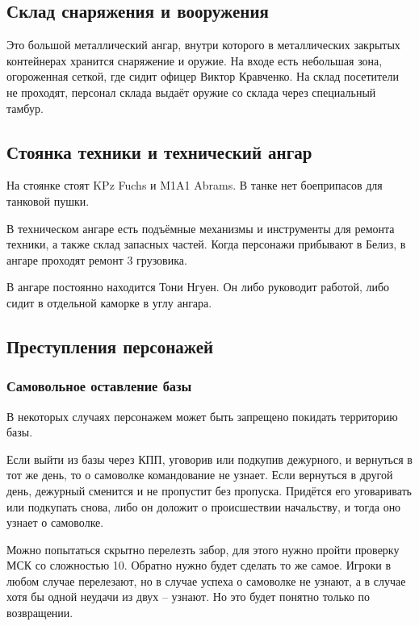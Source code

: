 \documentclass{article}
\begin{document}
\subsection{Склад снаряжения и
вооружения}\label{equipment-storage}

Это большой металлический ангар, внутри которого в металлических
закрытых контейнерах хранится снаряжение и оружие. На входе есть
небольшая зона, огороженная сеткой, где сидит офицер Виктор Кравченко.
На склад посетители не проходят, персонал склада выдаёт оружие со склада
через специальный тамбур.

\subsection{Стоянка техники и технический
ангар}\label{vehicle-parking}

На стоянке стоят KPz Fuchs и M1A1 Abrams. В танке нет боеприпасов для
танковой пушки.

В техническом ангаре есть подъёмные механизмы и инструменты для ремонта
техники, а также склад запасных частей. Когда персонажи прибывают в
Белиз, в ангаре проходят ремонт 3 грузовика.

В ангаре постоянно находится Тони Нгуен. Он либо руководит работой, либо
сидит в отдельной каморке в углу ангара.

\subsection{Преступления
персонажей}\label{character-crimes}

\subsubsection{Самовольное оставление
базы}\label{unauthorized-departure}

В некоторых случаях персонажем может быть запрещено покидать территорию
базы.

Если выйти из базы через КПП, уговорив или подкупив дежурного, и
вернуться в тот же день, то о самоволке командование не узнает. Если
вернуться в другой день, дежурный сменится и не пропустит без пропуска.
Придётся его уговаривать или подкупать снова, либо он доложит о
происшествии начальству, и тогда оно узнает о самоволке.

Можно попытаться скрытно перелезть забор, для этого нужно пройти
проверку МСК со сложностью 10. Обратно нужно будет сделать то же самое.
Игроки в любом случае перелезают, но в случае успеха о самоволке не
узнают, а в случае хотя бы одной неудачи из двух -- узнают. Но это будет
понятно только по возвращении.
\end{document}
